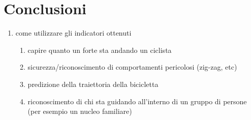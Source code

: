 \documentclass[class=article]{standalone}
\begin{document}
	\section{Conclusioni}
	\begin{enumerate}
		\item come utilizzare gli indicatori ottenuti
		\begin{enumerate}
			\item capire quanto un forte sta andando un ciclista
			\item sicurezza/riconoscimento di comportamenti pericolosi (zig-zag, etc)
			\item predizione della traiettoria della bicicletta
			\item riconoscimento di chi sta guidando all'interno di un gruppo di persone (per esempio un nucleo familiare)
		\end{enumerate}
	\end{enumerate}
\end{document}
